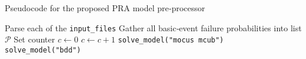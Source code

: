 \begin{algorithm}[H]
\caption{Pseudocode for the proposed PRA model pre‐processor}
\label{alg:preprocessor}
\begin{algorithmic}[1]
\State Parse each of the \texttt{input\_files}
\State Gather all basic‐event failure probabilities into list $\mathcal{P}$
\State Set counter $c \leftarrow 0$
\State $c \leftarrow c + 1$
\EndIf
\EndFor
{}
\State \texttt{solve\_model("mocus mcub")}
\Else
\State \texttt{solve\_model("bdd")}
\EndIf
\EndProcedure
\end{algorithmic}
\end{algorithm}